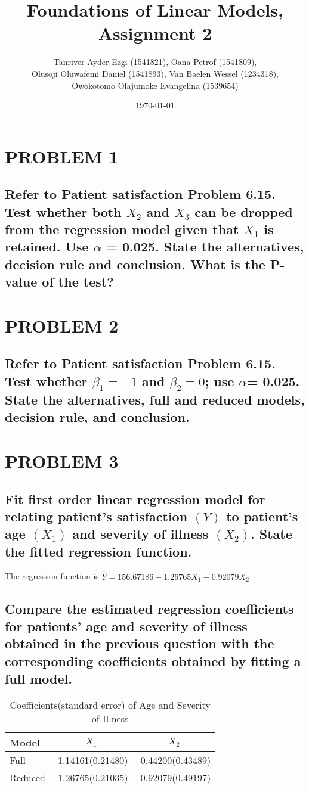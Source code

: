\documentclass[a4paper,9pt]{article}\usepackage[]{graphicx}\usepackage[]{color}
\title{Foundations of Linear Models, Assignment 2}
\author{Tanriver Ayder Ezgi (1541821), Oana Petrof (1541809), \\Olusoji Oluwafemi Daniel (1541893), Van Baelen Wessel (1234318), \\Owokotomo Olajumoke Evangelina (1539654)}
\date{\today}
\begin{document}
\maketitle
\section*{PROBLEM 1}
\subsection*{Refer to Patient satisfaction Problem 6.15. Test whether both $X_2$ and $X_3$ can be dropped from the regression model given that $X_1$ is retained. Use $\alpha$ = 0.025. State the alternatives, decision rule and conclusion. What is the P-value of the test?}

\section*{PROBLEM 2}
\subsection*{Refer to Patient satisfaction Problem 6.15. Test whether $\beta_1 = -1$ and $\beta_2 = 0$; use $\alpha$= 0.025. State the alternatives, full and reduced models, decision rule, and conclusion.}

\section*{PROBLEM 3}
\subsection*{Fit first order linear regression model for relating patient's satisfaction $(Y)$ to patient's age $(X_{1})$ and severity of illness $(X_{2})$. State the fitted regression function.}

The regression function is  $\hat{Y} = 156.67186 - 1.26765X_1 - 0.92079X_2$

\subsection*{Compare the estimated regression coefficients for patients' age and severity of illness obtained in the previous question with the corresponding coefficients obtained by fitting a full model.}

\begin{table}[h]
\centering
\begin{tabular}{lcc}
\hline
Model & $X_{1}$ & $X_{2}$\\
\hline
Full &  -1.14161(0.21480) & -0.44200(0.43489)\\
Reduced & -1.26765(0.21035) & -0.92079(0.49197)\\
\hline
\end{tabular}
\caption{Coefficients(standard error) of Age and Severity of Illness}
\end{table}
\end{document}
